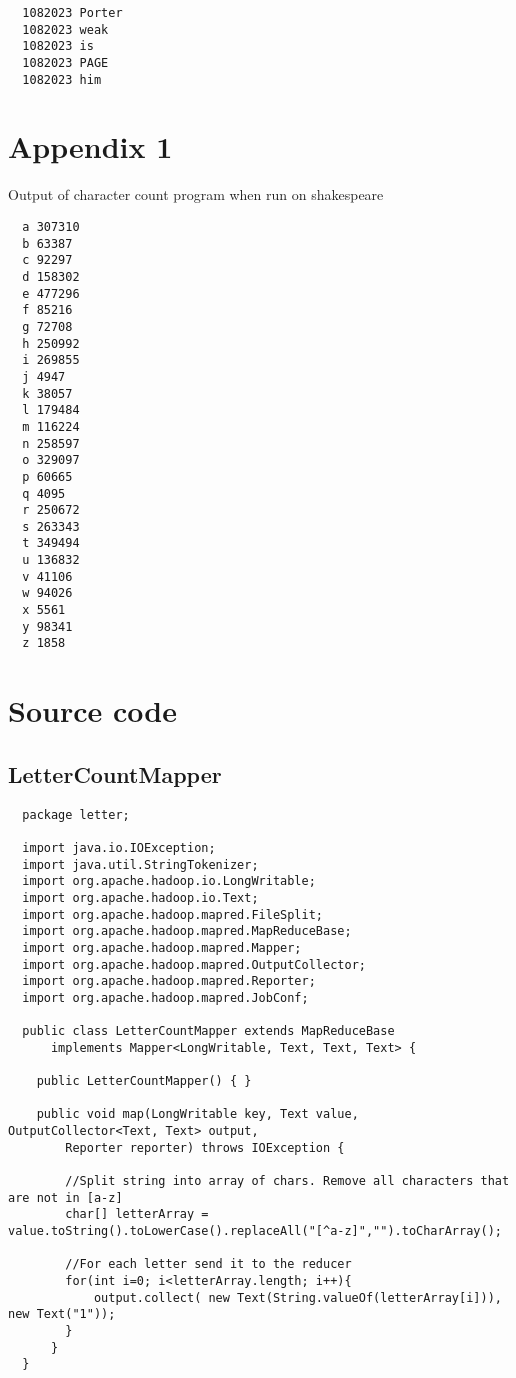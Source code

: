\documentclass[10pt, a4paper]{article}
\begin{document}
\begin{verbatim}
  1082023 Porter
  1082023 weak
  1082023 is
  1082023 PAGE
  1082023 him
\end{verbatim}


\newpage
\section*{Appendix 1} %
\label{sec:appendix_1}
Output of character count program when run on shakespeare
\begin{verbatim}
  a	307310
  b	63387
  c	92297
  d	158302
  e	477296
  f	85216
  g	72708
  h	250992
  i	269855
  j	4947
  k	38057
  l	179484
  m	116224
  n	258597
  o	329097
  p	60665
  q	4095
  r	250672
  s	263343
  t	349494
  u	136832
  v	41106
  w	94026
  x	5561
  y	98341
  z	1858
\end{verbatim}


\newpage
\section{Source code} %

\subsection{LetterCountMapper} %
\label{sub:lettercountmapper}
\begin{lstlisting}
  package letter;

  import java.io.IOException;
  import java.util.StringTokenizer;
  import org.apache.hadoop.io.LongWritable;
  import org.apache.hadoop.io.Text;
  import org.apache.hadoop.mapred.FileSplit;
  import org.apache.hadoop.mapred.MapReduceBase;
  import org.apache.hadoop.mapred.Mapper;
  import org.apache.hadoop.mapred.OutputCollector;
  import org.apache.hadoop.mapred.Reporter;
  import org.apache.hadoop.mapred.JobConf;

  public class LetterCountMapper extends MapReduceBase
      implements Mapper<LongWritable, Text, Text, Text> {

    public LetterCountMapper() { }

    public void map(LongWritable key, Text value, OutputCollector<Text, Text> output,
        Reporter reporter) throws IOException {

  	    //Split string into array of chars. Remove all characters that are not in [a-z]  
  	    char[] letterArray = value.toString().toLowerCase().replaceAll("[^a-z]","").toCharArray();

  	    //For each letter send it to the reducer
  	    for(int i=0; i<letterArray.length; i++){
  	    	output.collect( new Text(String.valueOf(letterArray[i])), new Text("1"));
  	    }
  	  }
  }
\end{lstlisting}
\end{document}
